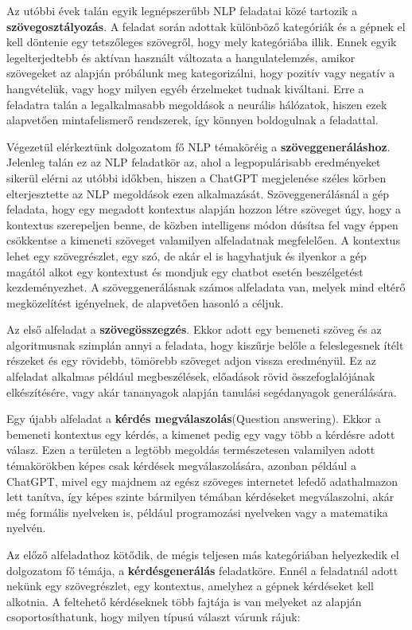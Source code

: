 Az utóbbi évek talán egyik legnépszerűbb NLP feladatai közé tartozik a \textbf{szövegosztályozás}. A feladat során adottak különböző kategóriák és a gépnek el kell döntenie egy tetszőleges szövegről, hogy mely kategóriába illik. Ennek egyik legelterjedtebb és aktívan használt változata a hangulatelemzés, amikor szövegeket az alapján próbálunk meg kategorizálni, hogy pozitív vagy negatív a hangvételük, vagy hogy milyen egyéb érzelmeket tudnak kiváltani. Erre a feladatra talán a legalkalmasabb megoldások a neurális hálózatok, hiszen ezek alapvetően mintafelismerő rendszerek, így könnyen boldogulnak a feladattal.

	Végezetül elérkeztünk dolgozatom fő NLP témaköréig a \textbf{szöveggeneráláshoz}. Jelenleg talán ez az NLP feladatkör az, ahol a legpopulárisabb eredményeket sikerül elérni az utóbbi időkben, hiszen a ChatGPT megjelenése széles körben elterjesztette az NLP megoldások ezen alkalmazását. Szöveggenerálásnál a gép feladata, hogy egy megadott kontextus alapján hozzon létre szöveget úgy, hogy a kontextus szerepeljen benne, de közben intelligens módon dúsítsa fel vagy éppen csökkentse a kimeneti szöveget valamilyen alfeladatnak megfelelően. A kontextus lehet egy szövegrészlet, egy szó, de akár el is hagyhatjuk és ilyenkor a gép magától alkot egy kontextust és mondjuk egy chatbot esetén beszélgetést kezdeményezhet. A szöveggenerálásnak számos alfeladata van, melyek mind eltérő megközelítést igényelnek, de alapvetően hasonló a céljuk.
	
	Az első alfeladat a \textbf{szövegösszegzés}. Ekkor adott egy bemeneti szöveg és az algoritmusnak szimplán annyi a feladata, hogy kiszűrje belőle a feleslegesnek ítélt részeket és egy rövidebb, tömörebb szöveget adjon vissza eredményül. Ez az alfeladat alkalmas például megbeszélések, előadások rövid összefoglalójának elkészítésére, vagy akár tananyagok alapján tanulási segédanyagok generálására.
	
	Egy újabb alfeladat a \textbf{kérdés megválaszolás}(Question answering). Ekkor a bemeneti kontextus egy kérdés, a kimenet pedig egy vagy több a kérdésre adott válasz. Ezen a területen a legtöbb megoldás természetesen valamilyen adott témakörökben képes csak kérdések megválaszolására, azonban például a ChatGPT, mivel egy majdnem az egész szöveges internetet lefedő adathalmazon lett tanítva, így képes szinte bármilyen témában kérdéseket megválaszolni, akár még formális nyelveken is, például programozási nyelveken vagy a matematika nyelvén.
	
	Az előző alfeladathoz kötődik, de mégis teljesen más kategóriában helyezkedik el dolgozatom fő témája, a \textbf{kérdésgenerálás} feladatköre. Ennél a feladatnál adott nekünk egy szövegrészlet, egy kontextus, amelyhez a gépnek kérdéseket kell alkotnia. A feltehető kérdéseknek több fajtája is van melyeket az alapján csoportosíthatunk, hogy milyen típusú választ várunk rájuk\cite{questions}:

